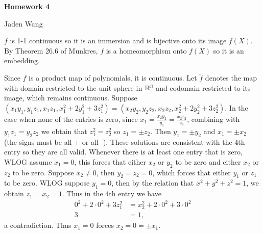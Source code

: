 \documentclass[12pt]{article}
\begin{document}
\centerline {\textsf{\textbf{\LARGE{Homework 4}}}}
\centerline {Jaden Wang}
\vspace{.15in}
\begin{problem}[1]
$ f$ is 1-1 continuous so it is an immersion and is bijective onto its image $ f(X)$. By Theorem 26.6 of Munkres, $ f$ is a homeomorphism onto $ f(X)$ so it is an embedding.
\end{problem}
\begin{problem}[4]
	Since $ f$ is a product map of polynomials, it is continuous. Let $ \widetilde{ f}$ denotes the map with domain restricted to the unit sphere in  $ \mathbb{R}^3$ and codomain restricted to its image, which remains continuous. Suppose $ (x_1y_1,y_1z_1,x_1z_1,x_1^2+2y_1^2+3z_1^2) =(x_2y_2,y_2z_2,x_2z_2,x_2^2+2y_2^2+3z_2^2)$. In the case when none of the entries is zero, since $ x_1 = \frac{x_2y_2}{y_1 } = \frac{x_2z_2}{ z_1}$, combining with $ y_1 z_1 = y_2 z_2$  we obtain that $ z_1^2 = z_2^2$ so $ z_1 = \pm z_2$. Then $ y_1 = \pm y_2$ and $ x_1 = \pm x_2$ (the signs must be all + or all -). These solutions are consistent with the 4th entry so they are all valid. Whenever there is at least one entry that is zero, WLOG assume $ x_1 = 0$, this forces that either $ x_2$ or $ y_2$ to be zero and either $ x_2$ or $ z_2$ to be zero. Suppose $ x_2 \neq 0$, then $ y_2 = z_2 =0$, which forces that either $ y_1$ or $ z_1$ to be zero. WLOG suppose $ y_1=0$, then by the relation that $ x^2+y^2+z^2=1$, we obtain $ z_1=x_2=1$. Thus in the 4th entry we have
\begin{align*}
	0^2+2 \cdot 0^2+ 3 z_1^2 &= x_2^2 + 2 \cdot 0^2 + 3 \cdot 0^2\\
	3 &= 1,
\end{align*}
a contradiction. Thus $ x_1=0$ forces $ x_2 = 0 = \pm x_1$. 


\end{problem}
\end{document}
